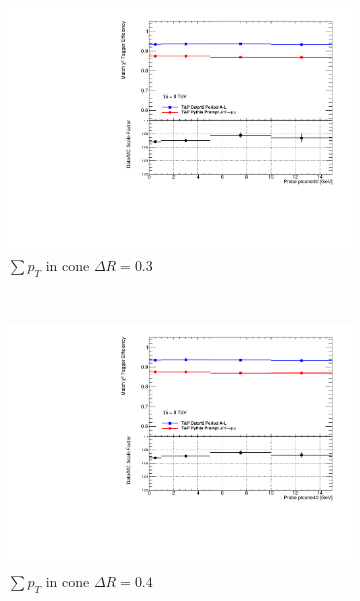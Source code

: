 \begin{figure}[phtb]
\begin{subfigure}[b]{0.31\textwidth}
      \includegraphics[width=\textwidth]{PartCalibration2012/Plots/SFPlots/ptcone30_smt.pdf}
      \caption{$\sum p_{T}$ in cone $\Delta R=0.3$} \label{fig:Alleffsfptcone30}
    \end{subfigure}
    ~
    \begin{subfigure}[b]{0.31\textwidth}
      \includegraphics[width=\textwidth]{PartCalibration2012/Plots/SFPlots/ptcone40_smt.pdf}
      \caption{$\sum p_{T}$ in cone $\Delta R=0.4$} \label{fig:Alleffsfptcone40}
    \end{subfigure}
    ~
    \begin{subfigure}[b]{0.31\textwidth}

\end{subfigure}
\end{figure}
